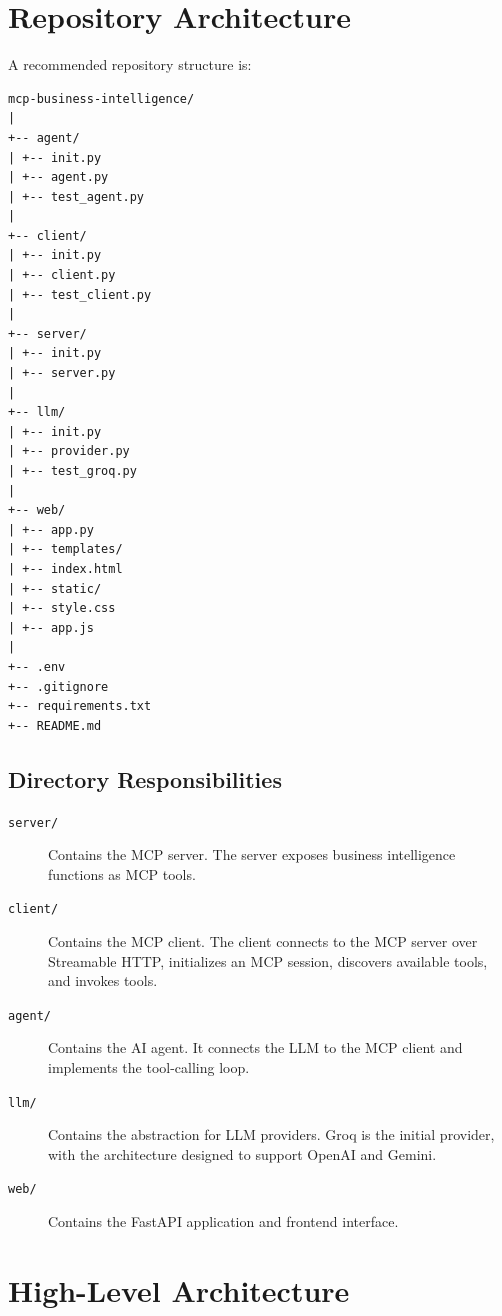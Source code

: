 \documentclass[11pt,a4paper]{article}
\begin{document}
\section{Repository Architecture}

A recommended repository structure is:

\begin{lstlisting}[style=terminal]
mcp-business-intelligence/
|
+-- agent/
| +-- init.py
| +-- agent.py
| +-- test_agent.py
|
+-- client/
| +-- init.py
| +-- client.py
| +-- test_client.py
|
+-- server/
| +-- init.py
| +-- server.py
|
+-- llm/
| +-- init.py
| +-- provider.py
| +-- test_groq.py
|
+-- web/
| +-- app.py
| +-- templates/
| +-- index.html
| +-- static/
| +-- style.css
| +-- app.js
|
+-- .env
+-- .gitignore
+-- requirements.txt
+-- README.md
\end{lstlisting}

\subsection{Directory Responsibilities}

\begin{description}

\item[\texttt{server/}]
Contains the MCP server. The server exposes business intelligence
functions as MCP tools.

\item[\texttt{client/}]
Contains the MCP client. The client connects to the MCP server over
Streamable HTTP, initializes an MCP session, discovers available tools,
and invokes tools.

\item[\texttt{agent/}]
Contains the AI agent. It connects the LLM to the MCP client and
implements the tool-calling loop.

\item[\texttt{llm/}]
Contains the abstraction for LLM providers. Groq is the initial provider,
with the architecture designed to support OpenAI and Gemini.

\item[\texttt{web/}]
Contains the FastAPI application and frontend interface.

\end{description}

\section{High-Level Architecture}
\end{document}
